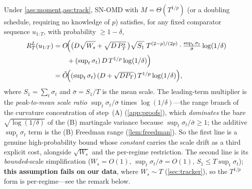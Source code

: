 \documentclass{article}
\begin{document}
\begin{theorem}
\label{thm:regret}
Under \cref{ass:moment,ass:track}, SN-OMD with $M=\Theta(T^{1/p})$ (or a
doubling schedule, requiring no knowledge of $p$) satisfies, for any fixed comparator
sequence $u_{1:T}$, with probability $\ge1-\delta$,
\begin{align}
\label{eq:mainbound}
R_T^L(u_{1:T})
&= O\!\Bigl(\bigl(D\sqrt{W_s}+\sqrt{D\,P_T^s}\,\bigr)\sqrt{S_1}\;T^{(2-p)/(2p)}
   \cdot\tfrac{\sup_t\sigma_t}{\bar\sigma}\log(1/\delta)\\
&\qquad{}+(\textstyle\sup_t\sigma_t)\,D\,T^{1/p}\log(1/\delta)\Bigr)\nonumber\\
&= \tilde O\!\Bigl((\textstyle\sup_t\sigma_t)\,(D+\sqrt{D P_T})\,T^{1/p}
   \log(1/\delta)\Bigr),\nonumber
\end{align}
where $S_1=\sum_t\sigma_t$ and $\bar\sigma=S_1/T$ is the mean scale. The leading-term
multiplier is the \emph{peak-to-mean scale ratio} $\sup_t\sigma_t/\bar\sigma$ times
$\log(1/\delta)$---the range branch of the curvature concentration of step~(A)
(\cref{app:proofs}), which \emph{dominates} the bare $\sqrt{\log(1/\delta)}$ of the (B)
martingale variance because $\sup_t\sigma_t/\bar\sigma\ge1$; the additive $\sup_t\sigma_t$ term
is the (B) Freedman range (\cref{lem:freedman}). So the first line is a genuine
high-probability bound whose \emph{constant} carries the scale drift as a third explicit cost,
alongside $\sqrt{W_s}$ and the per-regime restriction. The second line is its
\emph{bounded}-scale simplification ($W_s=O(1)$, $\sup_t\sigma_t/\bar\sigma=O(1)$,
$S_1\le T\sup_t\sigma_t$); \textbf{this assumption fails on our data}, where $W_s\sim T$
(\cref{sec:tracker}), so the $T^{1/p}$ form is per-regime---see the remark below.
\end{theorem}
\end{document}
